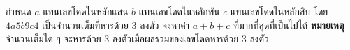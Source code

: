 ﻿%
\question กำหนด $a$ แทนเลขโดดในหลักแสน $b$ แทนเลขโดดในหลักพัน $c$ แทนเลขโดดในหลักสิบ  \newline
โดย $4a5b9c4$ เป็นจำนวนเต็มที่หารด้วย 3 ลงตัว \newline
จงหาค่า $a+b+c$ ที่มากที่สุดที่เป็นไปได้ \newline
\textbf{หมายเหตุ} จำนวนเต็มใด ๆ จะหารด้วย 3 ลงตัวเมื่อผลรวมของเลขโดดหารด้วย 3 ลงตัว
\newline
{}
